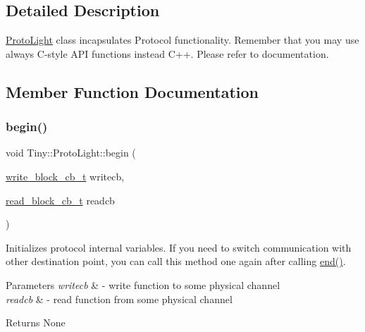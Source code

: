 \subsection{Detailed Description}
\hyperlink{classTiny_1_1ProtoLight}{Proto\+Light} class incapsulates Protocol functionality. Remember that you may use always C-\/style A\+PI functions instead C++. Please refer to documentation. 

\subsection{Member Function Documentation}
\mbox{\label{classTiny_1_1ProtoLight_ad27dfcef54a8316228469ef0a4267962}} 
\subsubsection{\texorpdfstring{begin()}{begin()}}
{\footnotesize\ttfamily void Tiny\+::\+Proto\+Light\+::begin (\begin{DoxyParamCaption}\item[{\hyperlink{tiny__types_8h_aafd634660bba76cace57a8f9b01e044d}{write\+\_\+block\+\_\+cb\+\_\+t}}]{writecb,  }\item[{\hyperlink{tiny__types_8h_a15bec127d9ee63658563d62e92b5261b}{read\+\_\+block\+\_\+cb\+\_\+t}}]{readcb }\end{DoxyParamCaption})}

Initializes protocol internal variables. If you need to switch communication with other destination point, you can call this method one again after calling \hyperlink{classTiny_1_1ProtoLight_a948b2a0e37177b7434581adc64b36497}{end()}. 
\begin{DoxyParams}{Parameters}
{\em writecb} & -\/ write function to some physical channel \\
\hline
{\em readcb} & -\/ read function from some physical channel \\
\hline
\end{DoxyParams}
\begin{DoxyReturn}{Returns}
None 
\end{DoxyReturn}
\mbox{\label{classTiny_1_1ProtoLight_a50bf63fe1891edda48980ca2893485d7}} 
